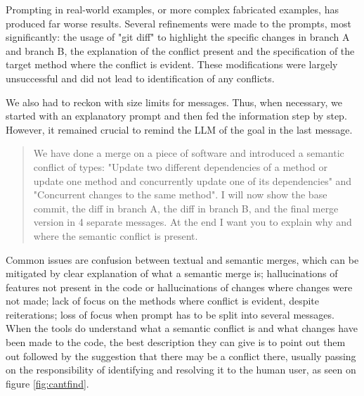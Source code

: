 Prompting in real-world examples, or more complex fabricated examples, has produced far worse results. Several refinements were made to the prompts, most significantly: the usage of "git diff" to highlight the specific changes in branch A and branch B, the explanation of the conflict present and the specification of the target method where the conflict is evident. These modifications were largely unsuccessful and did not lead to identification of any conflicts.

We also had to reckon with size limits for messages. Thus, when necessary, we started with an explanatory prompt and then fed the information step by step. However, it remained crucial to remind the LLM of the goal in the last message.

\begin{quote}
We have done a merge on a piece of software and introduced a semantic conflict of types: "Update two different dependencies of a method or update one method and concurrently update one of its dependencies" and "Concurrent changes to the same method". I will now show the base commit, the diff in branch A, the diff in branch B, and the final merge version in 4 separate messages. At the end I want you to explain why and where the semantic conflict is present.
\end{quote}

Common issues are confusion between textual and semantic merges, which can be mitigated by clear explanation of what a semantic merge is; hallucinations of features not present in the code or hallucinations of changes where changes were not made; lack of focus on the methods where conflict is evident, despite reiterations; loss of focus when prompt has to be split into several messages. When the tools do understand what a semantic conflict is and what changes have been made to the code, the best description they can give is to point out them out followed by the suggestion that there may be a conflict there, usually passing on the responsibility of identifying and resolving it to the human user, as seen on figure \ref{fig:cantfind}.

